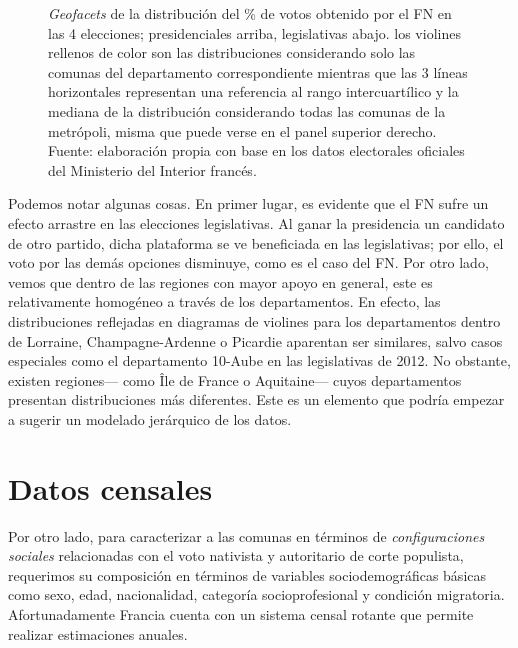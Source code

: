 \begin{figure}[h]
\begin{subfigure}{0.4\textwidth}
	\end{subfigure}
	\caption{\textit{Geofacets} de la distribución del \% de votos obtenido por el FN en las 4 elecciones; presidenciales arriba, legislativas abajo. los violines rellenos de color son las distribuciones considerando solo las comunas del departamento correspondiente mientras que las 3 líneas horizontales representan una referencia al rango intercuartílico y la mediana de la distribución considerando todas las comunas de la metrópoli, misma que puede verse en el panel superior derecho. Fuente: elaboración propia con base en los datos electorales oficiales del Ministerio del Interior francés.}
	\label{fig:Geofacet_Distr_Dptos_FN}	
\end{figure}

Podemos notar algunas cosas. En primer lugar, es evidente que el FN sufre un efecto arrastre en las elecciones legislativas. Al ganar la presidencia un candidato de otro partido, dicha plataforma se ve beneficiada en las legislativas; por ello, el voto por las demás opciones disminuye, como es el caso del FN. Por otro lado, vemos que dentro de las regiones con mayor apoyo en general, este es relativamente homogéneo a través de los departamentos. En efecto, las distribuciones reflejadas en diagramas de violines para los departamentos dentro de Lorraine, Champagne-Ardenne o Picardie aparentan ser similares, salvo casos especiales como el departamento 10-Aube en las legislativas de 2012. No obstante, existen regiones--- como Île de France o Aquitaine--- cuyos departamentos presentan distribuciones más diferentes. Este es un elemento que podría empezar a sugerir un modelado jerárquico de los datos.

\section{Datos censales}

Por otro lado, para caracterizar a las comunas en términos de \textit{configuraciones sociales} relacionadas con el voto nativista y autoritario de corte populista, requerimos su composición en términos de variables sociodemográficas básicas como sexo, edad, nacionalidad, categoría socioprofesional y condición migratoria. Afortunadamente Francia cuenta con un sistema censal rotante que permite realizar estimaciones anuales.\\ 


